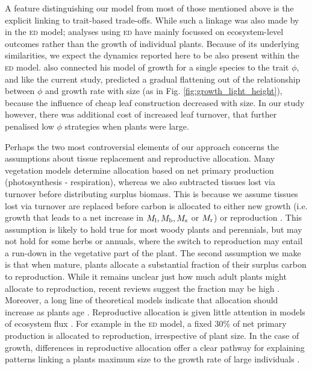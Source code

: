 \documentclass[a4paper,11pt]{article}
\begin{document}
A feature distinguishing our model from most of those mentioned above is the explicit linking to trait-based trade-offs. While such a linkage was also made by \citet{Moorcroft-2001} in the \textsc{ed} model; analyses using \textsc{ed} have mainly focussed on ecosystem-level outcomes rather than the growth of individual plants. Because of its underlying similarities, we expect the dynamics reported here to be also present within the \textsc{ed} model. \citet{King-1999} also connected his model of growth for a single species to the trait $\phi$, and like the current study, predicted a gradual flattening out of the relationship between $\phi$ and growth rate with size (as in Fig. \ref{fig:growth_light_height}), because the influence of cheap leaf construction decreased with size. In our study however, there was additional cost of increased leaf turnover, that further penalised low $\phi$ strategies when plants were large.

Perhaps the two most controversial elements of our approach concerns the assumptions about tissue replacement and reproductive allocation. Many vegetation models determine allocation based on net primary production (photosynthesis - respiration), whereas we also subtracted tissues lost via turnover before distributing surplus biomass. This is because we assume tissues lost via turnover are replaced before carbon is allocated to either new growth (i.e. growth that leads to a net increase in $M_{\rm l}, M_{\rm b}, M_{\rm s}$ or $M_{\rm r}$) or reproduction \citep{Thornley-2000}. This assumption is likely to hold true for most woody plants and perennials, but may not hold for some herbs or annuals, where the switch to reproduction may entail a run-down in the vegetative part of the plant. The second assumption we make is that when mature, plants allocate a substantial fraction of their surplus carbon to reproduction. While it remains unclear just how much adult plants might allocate to reproduction, recent reviews suggest the fraction may be high \citep{Thomas-2011, Wenk-2015}. Moreover, a long line of theoretical models indicate that allocation should increase as plants age \citep[reviewed by ][]{Wenk-2015}. Reproductive allocation is given little attention in models of ecosystem flux \citep[e.g.][]{Sitch-2008, DeKauwe-2014}. For example in the \textsc{ed} model, a fixed 30\% of net primary production is allocated to reproduction, irrespective of plant size. In the case of growth, differences in reproductive allocation offer a clear pathway for explaining patterns linking a plants maximum size to the growth rate of large individuals \citep[e.g.][]{Wright-2010}.
\end{document}
